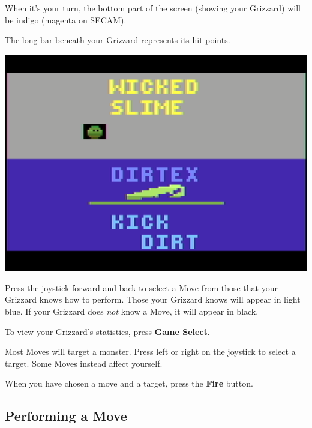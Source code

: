 \documentclass[10pt,twocolumn,openany,article]{memoir}
\begin{document}
When  it's your  turn,  the  bottom part  of  the  screen (showing  your
Grizzard) will be indigo (magenta on SECAM). 

The long bar beneath your Grizzard represents its hit points.

\begin{center}
  \includegraphics[width=\columnwidth]{../Manual/GrizzardCombatNTSC.png}
\end{center}

Press the  joystick forward and  back to select  a Move from  those that
your  Grizzard knows  how to  perform.  Those your  Grizzard knows  will
appear in light  blue. If your Grizzard does \emph{not}  know a Move, it
will appear in black.

To view your Grizzard's statistics, press \textbf{Game Select}.

Most Moves will target a monster. Press left or right on the joystick to
select a target. Some Moves instead affect yourself.

When   you   have   chosen   a    move   and   a   target,   press   the
\textbf{Fire} button.


\subsection{Performing a Move}
\end{document}
